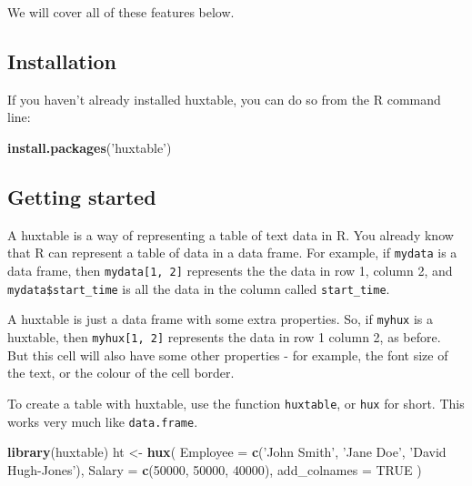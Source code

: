 \documentclass[]{article}
\newenvironment{Shaded}{\begin{snugshade}}{\end{snugshade}}
\newcommand{\KeywordTok}[1]{\textcolor[rgb]{0.13,0.29,0.53}{\textbf{#1}}}
\newcommand{\DataTypeTok}[1]{\textcolor[rgb]{0.13,0.29,0.53}{#1}}
\newcommand{\DecValTok}[1]{\textcolor[rgb]{0.00,0.00,0.81}{#1}}
\newcommand{\StringTok}[1]{\textcolor[rgb]{0.31,0.60,0.02}{#1}}
\newcommand{\OtherTok}[1]{\textcolor[rgb]{0.56,0.35,0.01}{#1}}
\newcommand{\NormalTok}[1]{#1}
\begin{document}
We will cover all of these features below.

\subsection{Installation}\label{installation}

If you haven't already installed huxtable, you can do so from the R
command line:

\begin{Shaded}
\begin{Highlighting}[]
\KeywordTok{install.packages}\NormalTok{(}\StringTok{'huxtable'}\NormalTok{)}
\end{Highlighting}
\end{Shaded}

\FloatBarrier

\subsection{Getting started}\label{getting-started}

A huxtable is a way of representing a table of text data in R. You
already know that R can represent a table of data in a data frame. For
example, if \texttt{mydata} is a data frame, then
\texttt{mydata{[}1,\ 2{]}} represents the the data in row 1, column 2,
and \texttt{mydata\$start\_time} is all the data in the column called
\texttt{start\_time}.

A huxtable is just a data frame with some extra properties. So, if
\texttt{myhux} is a huxtable, then \texttt{myhux{[}1,\ 2{]}} represents
the data in row 1 column 2, as before. But this cell will also have some
other properties - for example, the font size of the text, or the colour
of the cell border.

To create a table with huxtable, use the function \texttt{huxtable}, or
\texttt{hux} for short. This works very much like \texttt{data.frame}.

\begin{Shaded}
\begin{Highlighting}[]
\KeywordTok{library}\NormalTok{(huxtable)}
\NormalTok{ht <-}\StringTok{ }\KeywordTok{hux}\NormalTok{(}
        \DataTypeTok{Employee     =} \KeywordTok{c}\NormalTok{(}\StringTok{'John Smith'}\NormalTok{, }\StringTok{'Jane Doe'}\NormalTok{, }\StringTok{'David Hugh-Jones'}\NormalTok{), }
        \DataTypeTok{Salary       =} \KeywordTok{c}\NormalTok{(}\DecValTok{50000}\NormalTok{, }\DecValTok{50000}\NormalTok{, }\DecValTok{40000}\NormalTok{),}
        \DataTypeTok{add_colnames =} \OtherTok{TRUE}
\NormalTok{      )}
\end{Highlighting}
\end{Shaded}
\end{document}
